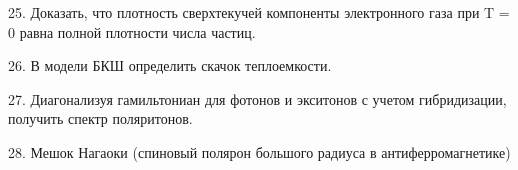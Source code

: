\documentclass[a4paper,12pt]{article} %
\begin{document}
\begin{task}

25. Доказать, что плотность сверхтекучей компоненты электронного газа при T = 0 равна полной плотности числа частиц.  

\end{task}


\begin{task}

26. В модели БКШ определить скачок теплоемкости.

\end{task}

\begin{task}

27. Диагонализуя гамильтониан для фотонов и экситонов с учетом гибридизации, получить спектр поляритонов. 


\end{task}



\begin{task}

28. Мешок Нагаоки (спиновый полярон большого радиуса в антиферромагнетике)


\end{task}




\printindex



\end{document}
